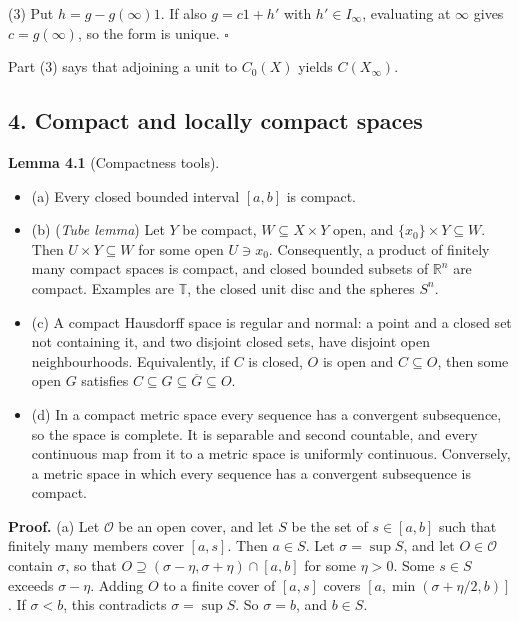 \documentclass[
  english,
  11pt,
  a4paper,
]{article}
\providecommand{\tightlist}{%
  \setlength{\itemsep}{0pt}\setlength{\parskip}{0pt}}
\begin{document}
(3) Put \(h=g-g(\infty)1\). If also \(g=c1+h'\) with \(h'\in I_\infty\),
evaluating at \(\infty\) gives \(c=g(\infty)\), so the form is unique.
\(\square\)

Part (3) says that adjoining a unit to \(C_0(X)\) yields
\(C(X_\infty)\).

\subsection[4. Compact and locally compact
spaces]{\texorpdfstring{\protect\hypertarget{the-stone-weierstrass-theorem-for-functions-vanishing-at-infinity--oa-fnd-sw-15}{}{}4.
Compact and locally compact
spaces}{4. Compact and locally compact spaces}}\label{the-stone-weierstrass-theorem-for-functions-vanishing-at-infinity--OA-FND-SW-15}

\textbf{Lemma 4.1} (Compactness tools).

\begin{itemize}
\tightlist
\item
  (a) Every closed bounded interval \([a,b]\) is compact.
\item
  (b) (\emph{Tube lemma}) Let \(Y\) be compact, \(W\subseteq X\times Y\)
  open, and \(\{x_0\}\times Y\subseteq W\). Then
  \(U\times Y\subseteq W\) for some open \(U\ni x_0\). Consequently, a
  product of finitely many compact spaces is compact, and closed bounded
  subsets of \(\mathbb R^n\) are compact. Examples are \(\mathbb T\),
  the closed unit disc and the spheres \(S^n\).
\item
  (c) A compact Hausdorff space is regular and normal: a point and a
  closed set not containing it, and two disjoint closed sets, have
  disjoint open neighbourhoods. Equivalently, if \(C\) is closed, \(O\)
  is open and \(C\subseteq O\), then some open \(G\) satisfies
  \(C\subseteq G\subseteq\overline G\subseteq O\).
\item
  (d) In a compact metric space every sequence has a convergent
  subsequence, so the space is complete. It is separable and second
  countable, and every continuous map from it to a metric space is
  uniformly continuous. Conversely, a metric space in which every
  sequence has a convergent subsequence is compact.
\end{itemize}

\textbf{Proof.} (a) Let \(\mathcal O\) be an open cover, and let \(S\)
be the set of \(s\in[a,b]\) such that finitely many members cover
\([a,s]\). Then \(a\in S\). Let \(\sigma=\sup S\), and let
\(O\in\mathcal O\) contain \(\sigma\), so that
\(O\supseteq(\sigma-\eta,\sigma+\eta)\cap[a,b]\) for some \(\eta>0\).
Some \(s\in S\) exceeds \(\sigma-\eta\). Adding \(O\) to a finite cover
of \([a,s]\) covers \([a,\min(\sigma+\eta/2,b)]\). If \(\sigma<b\), this
contradicts \(\sigma=\sup S\). So \(\sigma=b\), and \(b\in S\).
\end{document}
